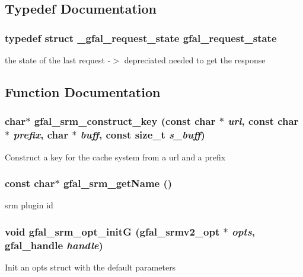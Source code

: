 \subsection{Typedef Documentation}
\subsubsection{\setlength{\rightskip}{0pt plus 5cm}typedef struct \bf{\_\-gfal\_\-request\_\-state}  \bf{gfal\_\-request\_\-state}}\label{gfal__common__srm_8h_c22ba8f2cb763532758e405bc3e51ed3}


the state of the last request -$>$ depreciated needed to get the response 

\subsection{Function Documentation}
\subsubsection{\setlength{\rightskip}{0pt plus 5cm}char$\ast$ gfal\_\-srm\_\-construct\_\-key (const char $\ast$ {\em url}, const char $\ast$ {\em prefix}, char $\ast$ {\em buff}, const size\_\-t {\em s\_\-buff})\hspace{0.3cm}{\tt  [inline]}}\label{gfal__common__srm_8h_583148369d56c8899aedf505a4bd2c5b}


Construct a key for the cache system from a url and a prefix 
\subsubsection{\setlength{\rightskip}{0pt plus 5cm}const char$\ast$ gfal\_\-srm\_\-get\-Name ()}\label{gfal__common__srm_8h_9eaea5b630099808082807628bd08e5f}


srm plugin id 
\subsubsection{\setlength{\rightskip}{0pt plus 5cm}void gfal\_\-srm\_\-opt\_\-init\-G (gfal\_\-srmv2\_\-opt $\ast$ {\em opts}, gfal\_\-handle {\em handle})}\label{gfal__common__srm_8h_00d7f2a5c374d306365e5dd0baf73c94}


Init an opts struct with the default parameters 
